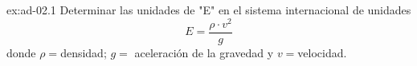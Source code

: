 \begin{multicols}{2}
    \begin{excercise}[][][$(E)=\mathrm{kg\cdot m^{-2}}$]{ex:ad-02.1}{
           Determinar las unidades de "E" en el sistema internacional de unidades
           \begin{equation*}
               E=\frac{\rho\cdot v^2}{g}
           \end{equation*}
           donde $\rho=$densidad; $g=$ aceleración de la gravedad y $v=$velocidad.
       }
    \end{excercise}

\end{multicols}

